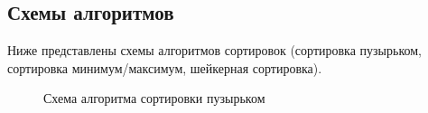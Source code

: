 \documentclass[a4paper,12pt]{article}
\begin{document}
\subsection{Схемы алгоритмов}
Ниже представлены схемы алгоритмов сортировок (сортировка пузырьком, сортировка минимум/максимум, шейкерная сортировка).
\begin{figure}[H]
\caption{Схема алгоритма сортировки пузырьком}
\label{images:scheme1}
\end{figure}
\end{document}
